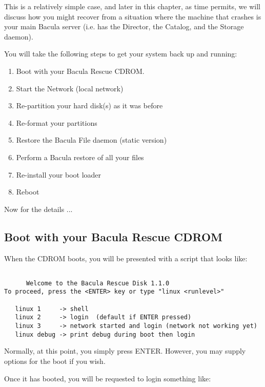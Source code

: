 This is a relatively simple case, and later in this chapter, as time permits,
we will discuss how you might recover from a situation where the machine that
crashes is your main Bacula server (i.e. has the Director, the Catalog, and
the Storage daemon). 

You will take the following steps to get your system back up and running: 

\begin{enumerate}
\item Boot with your Bacula Rescue CDROM.  
\item Start the Network (local network)  
\item Re-partition your hard disk(s) as it was before  
\item Re-format your partitions  
\item Restore the Bacula File daemon (static version)  
\item Perform a Bacula restore of all your files  
\item Re-install your boot loader  
\item Reboot 
   \end{enumerate}

Now for the details ... 

\subsection*{Boot with your Bacula Rescue CDROM}

When the CDROM boots, you will be presented with a script that looks like: 

\footnotesize
\begin{verbatim}
 
      Welcome to the Bacula Rescue Disk 1.1.0
To proceed, press the <ENTER> key or type "linux <runlevel>"
 
   linux 1     -> shell
   linux 2     -> login  (default if ENTER pressed)
   linux 3     -> network started and login (network not working yet)
   linux debug -> print debug during boot then login
\end{verbatim}
\normalsize

Normally, at this point, you simply press ENTER. However, you may supply
options for the boot if you wish. 

Once it has booted, you will be requested to login something like: 

